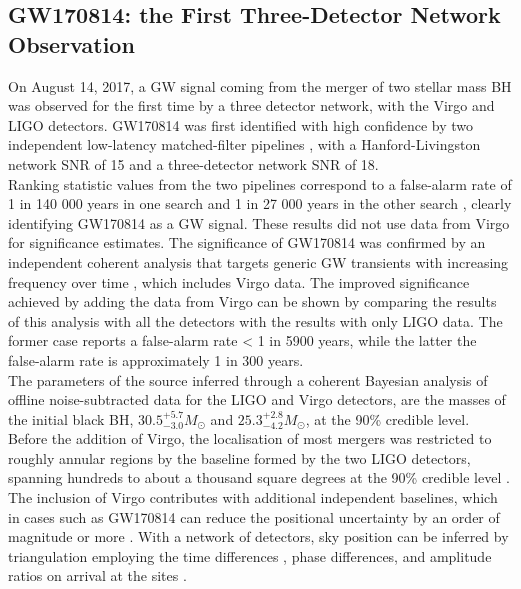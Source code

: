 \documentclass[binding=0.6cm, LaM]{sapthesis}
\begin{document}
\subsection{GW170814: the First Three-Detector Network Observation}	
	On August 14, 2017, a GW signal coming from the merger of two stellar mass BH 
	was observed for the first time by a three detector network, with the Virgo and LIGO detectors. 
	GW170814 was first identified with high confidence by two independent 
	low-latency matched-filter pipelines \cite{111,143-146,149},
	with a Hanford-Livingston network SNR of 15 and a three-detector network SNR of 18. \\
	Ranking statistic values from the two pipelines correspond to 
	a false-alarm rate of 1 in 140 000 years in one search \cite{114,143} 
	and 1 in 27 000 years in the other search \cite{111,146,149,150}, 
	clearly identifying GW170814 as a GW signal. 
	These results did not use data from Virgo for significance estimates.
	The significance of GW170814 was confirmed by 
	an independent coherent analysis that targets 
	generic GW transients with increasing frequency over time \cite{151},
	which includes Virgo data. 
	The improved significance achieved by adding the data from Virgo 
	can be shown by comparing the results of this analysis with 
	all the detectors with the results with only LIGO data.
	The former case reports a false-alarm rate < 1 in 5900 years,
	while the latter the false-alarm rate is approximately 1 in 300 years. \\ 
	The parameters of the source inferred through a coherent Bayesian analysis \cite{93, 152} 
	of offline noise-subtracted data for the LIGO and Virgo detectors, 
	are the  masses of the initial black BH, $30.5^{+5.7}_{-3.0}M_\odot$ 
	and $25.3^{+2.8}_{-4.2}M_\odot$, at the 90\% credible level. \\
	Before the addition of Virgo, the localisation of most mergers 
	was restricted to roughly annular regions by the baseline formed by the two LIGO detectors,
	spanning hundreds to about a thousand square degrees at the 90\% credible level \cite{165-167}. 
	The inclusion of Virgo contributes with additional independent baselines, 
	which in cases such as GW170814 can reduce the positional uncertainty by an order of magnitude or more \cite{166}. 
	With a network of detectors, sky position can be inferred by triangulation employing 	
	the time differences \cite{168,169}, phase differences, and amplitude ratios on arrival at the sites \cite{170}. 
\end{document}

